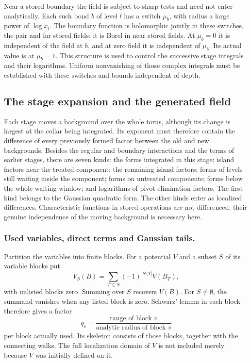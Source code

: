 \documentclass[11pt,letterpaper,reqno]{amsart}
\theoremstyle{definition}
\theoremstyle{remark}
\begin{document}
Near a stored boundary the field is subject to
sharp tests and need not enter analytically.
Each such bond $b$ of level $l$ has a switch
$\mu_b$, with radius a large power of $\log x_l$.
The boundary function is holomorphic jointly in
these switches, the pair and far stored fields;
it is Borel in near stored fields. At $\mu_b=0$
it is independent of the field at $b$, and at
zero field it is independent of $\mu_b$.
Its actual value is at $\mu_b=1$. This structure
is used to control the successive stage integrals
and their logarithms. Uniform nonvanishing of
those complex integrals must be established with
these switches and bounds independent of depth.


\subsection{The stage expansion and the generated field}

Each stage moves a background over the whole torus, although
its change is largest at the collar being integrated.
Its exponent must therefore contain the difference of
every previously formed factor between the old and new
backgrounds. Besides the regular and boundary interactions
and the terms of earlier stages, there are seven kinds:
the forms integrated in this stage; island factors near
the treated component; the remaining island factors;
forms of levels still waiting inside the component;
forms on untreated components; forms below the whole
waiting window; and logarithms of pivot-elimination factors.
The first kind belongs to the Gaussian quadratic form.
The other kinds enter as localized differences.
Characteristic functions in stored operations are not
differenced: their genuine independence of the moving
background is necessary here.

\subsubsection*{Used variables, direct terms and Gaussian tails.}

Partition the variables into finite blocks. For a potential
\(V\) and a subset \(S\) of its variable blocks put
\[
 V_S(B)=\sum_{T\subset S}(-1)^{|S\setminus T|}V(B_T),
\]
with unlisted blocks zero. Summing over \(S\) recovers
\(V(B)\). For \(S\ne\emptyset\), the summand vanishes
when any listed block is zero. Schwarz' lemma in each
block therefore gives a factor
\[
 q_v=\frac{\text{range of block }v}
                 {\text{analytic radius of block }v}
\]
per block actually used. Its skeleton consists of those
blocks, together with the connecting walks. The full
localization domain of \(V\) is not included merely
because \(V\) was initially defined on it.
\end{document}
